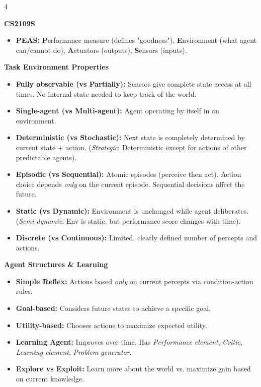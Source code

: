 \documentclass[8pt,landscape,a4paper]{extarticle}
\begin{document}
\begin{multicols*}{4} %

\noindent\textbf{CS2109S}
\small
{\footnotesize
\begin{itemize}[leftmargin=*, nosep]
    \item \textbf{PEAS:} \textbf{P}erformance measure (defines "goodness"), \textbf{E}nvironment (what agent can/cannot do), \textbf{A}ctuators (outputs), \textbf{S}ensors (inputs).
\end{itemize}

\vspace{1mm}
\noindent\textbf{Task Environment Properties}
\begin{itemize}[leftmargin=*, nosep]
    \item \textbf{Fully observable (vs Partially):} Sensors give complete state access at all times. No internal state needed to keep track of the world.
    \item \textbf{Single-agent (vs Multi-agent):} Agent operating by itself in an environment.
    \item \textbf{Deterministic (vs Stochastic):} Next state is completely determined by current state + action. (\textit{Strategic}: Deterministic except for actions of other predictable agents).
    \item \textbf{Episodic (vs Sequential):} Atomic episodes (perceive then act). Action choice depends \textit{only} on the current episode. Sequential decisions affect the future.
    \item \textbf{Static (vs Dynamic):} Environment is unchanged while agent deliberates. (\textit{Semi-dynamic}: Env is static, but performance score changes with time).
    \item \textbf{Discrete (vs Continuous):} Limited, clearly defined number of percepts and actions.
\end{itemize}

\vspace{1mm}
\noindent\textbf{Agent Structures \& Learning}
\begin{itemize}[leftmargin=*, nosep]
    \item \textbf{Simple Reflex:} Actions based \textit{only} on current percepts via condition-action rules.
    \item \textbf{Goal-based:} Considers future states to achieve a specific goal.
    \item \textbf{Utility-based:} Chooses actions to maximize expected utility.
    \item \textbf{Learning Agent:} Improves over time. Has \textit{Performance element}, \textit{Critic}, \textit{Learning element}, \textit{Problem generator}.
    \item \textbf{Explore vs Exploit:} Learn more about the world vs. maximize gain based on current knowledge.
\end{itemize}

}
\end{multicols*}
\end{document}
